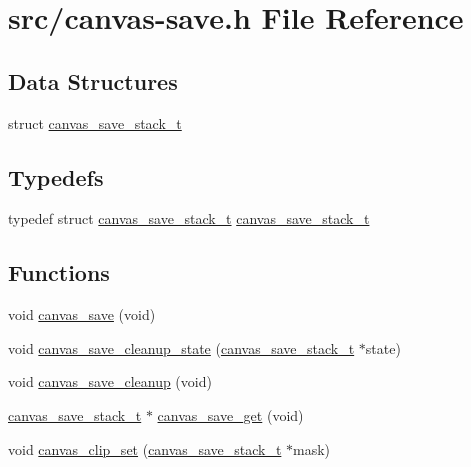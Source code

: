 \hypertarget{canvas-save_8h}{}\section{src/canvas-\/save.h File Reference}
\label{canvas-save_8h}
\subsection*{Data Structures}
\begin{DoxyCompactItemize}
\item 
struct \hyperlink{structcanvas__save__stack__t}{canvas\+\_\+save\+\_\+stack\+\_\+t}
\end{DoxyCompactItemize}
\subsection*{Typedefs}
\begin{DoxyCompactItemize}
\item 
typedef struct \hyperlink{structcanvas__save__stack__t}{canvas\+\_\+save\+\_\+stack\+\_\+t} \hyperlink{canvas-save_8h_ac48d601a20f95c93f677cd13d184ea11}{canvas\+\_\+save\+\_\+stack\+\_\+t}
\end{DoxyCompactItemize}
\subsection*{Functions}
\begin{DoxyCompactItemize}
\item 
void \hyperlink{canvas-save_8h_ae82cc37b7b2b1c9148a08032a0c7cc40}{canvas\+\_\+save} (void)
\item 
void \hyperlink{canvas-save_8h_ad66c58baf950803e925aff072d137d66}{canvas\+\_\+save\+\_\+cleanup\+\_\+state} (\hyperlink{structcanvas__save__stack__t}{canvas\+\_\+save\+\_\+stack\+\_\+t} $\ast$state)
\item 
void \hyperlink{canvas-save_8h_a2e0a1c92b277e1ba569f0c1a6d2eb093}{canvas\+\_\+save\+\_\+cleanup} (void)
\item 
\hyperlink{structcanvas__save__stack__t}{canvas\+\_\+save\+\_\+stack\+\_\+t} $\ast$ \hyperlink{canvas-save_8h_af7ed9425b815c74e76980a76480f31c4}{canvas\+\_\+save\+\_\+get} (void)
\item 
void \hyperlink{canvas-save_8h_aa4d2313aaea02c86e42f86ec5975fbe2}{canvas\+\_\+clip\+\_\+set} (\hyperlink{structcanvas__save__stack__t}{canvas\+\_\+save\+\_\+stack\+\_\+t} $\ast$mask)
\end{DoxyCompactItemize}


